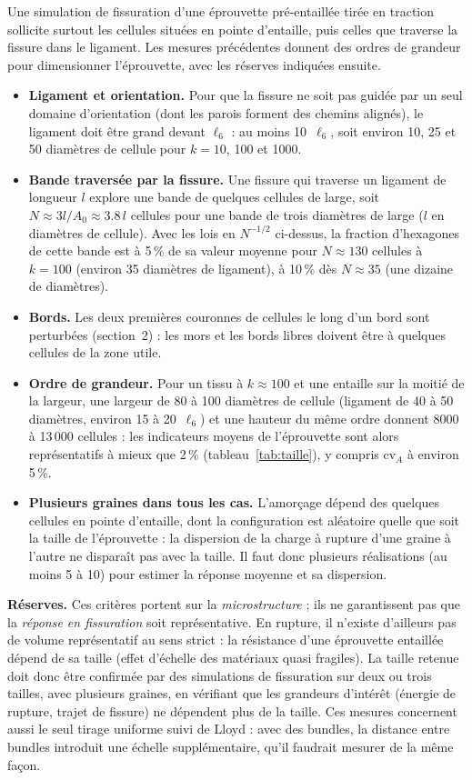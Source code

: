 \documentclass[10pt,a4paper]{article}
\begin{document}
Une simulation de fissuration d'une éprouvette pré-entaillée tirée en traction sollicite surtout les cellules
situées en pointe d'entaille, puis celles que traverse la fissure dans le ligament. Les mesures précédentes
donnent des ordres de grandeur pour dimensionner l'éprouvette, avec les réserves indiquées ensuite.
\begin{itemize}
  \item \textbf{Ligament et orientation.} Pour que la fissure ne soit pas guidée par un seul domaine d'orientation
    (dont les parois forment des chemins alignés), le ligament doit être grand devant $\ell_6$ : au moins
    10~$\ell_6$, soit environ 10, 25 et 50 diamètres de cellule pour $k=10$, 100 et 1000.
  \item \textbf{Bande traversée par la fissure.} Une fissure qui traverse un ligament de longueur $l$ explore une bande
    de quelques cellules de large, soit $N\approx3l/A_0\approx3.8\,l$ cellules pour une bande de trois diamètres
    de large ($l$ en diamètres de cellule). Avec les lois en $N^{-1/2}$ ci-dessus, la fraction d'hexagones de cette
    bande est à 5\,\% de sa valeur moyenne pour $N\approx130$ cellules à $k=100$ (environ 35 diamètres de
    ligament), à 10\,\% dès $N\approx35$ (une dizaine de diamètres).
  \item \textbf{Bords.} Les deux premières couronnes de cellules le long d'un bord sont perturbées
    (section~2) : les mors et les bords libres doivent être à quelques cellules de la zone utile.
  \item \textbf{Ordre de grandeur.} Pour un tissu à $k\approx100$ et une entaille sur la moitié de la largeur, une
    largeur de 80 à 100 diamètres de cellule (ligament de 40 à 50 diamètres, environ 15 à 20~$\ell_6$) et une
    hauteur du même ordre donnent 8000 à 13\,000 cellules : les indicateurs moyens de l'éprouvette sont alors
    représentatifs à mieux que 2\,\% (tableau~\ref{tab:taille}), y compris $\mathrm{cv}_A$ à environ 5\,\%.
  \item \textbf{Plusieurs graines dans tous les cas.} L'amorçage dépend des quelques cellules en pointe d'entaille,
    dont la configuration est aléatoire quelle que soit la taille de l'éprouvette : la dispersion de la charge à
    rupture d'une graine à l'autre ne disparaît pas avec la taille. Il faut donc plusieurs réalisations (au moins 5
    à 10) pour estimer la réponse moyenne et sa dispersion.
\end{itemize}
\textbf{Réserves.} Ces critères portent sur la \emph{microstructure} ; ils ne garantissent pas que la
\emph{réponse en fissuration} soit représentative. En rupture, il n'existe d'ailleurs pas de volume représentatif
au sens strict : la résistance d'une éprouvette entaillée dépend de sa taille (effet d'échelle des matériaux
quasi fragiles). La taille retenue doit donc être confirmée par des simulations de fissuration sur deux ou trois
tailles, avec plusieurs graines, en vérifiant que les grandeurs d'intérêt (énergie de rupture, trajet de fissure)
ne dépendent plus de la taille. Ces mesures concernent aussi le seul tirage uniforme suivi de Lloyd : avec des
bundles, la distance entre bundles introduit une échelle supplémentaire, qu'il faudrait mesurer de la même façon.
\end{document}
